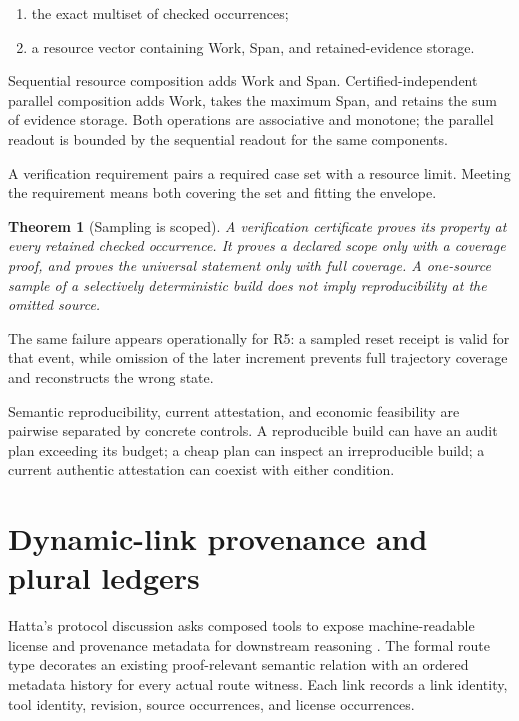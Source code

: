 \documentclass[11pt]{article}
\newtheorem{theorem}[definition]{Theorem}
\begin{document}
\begin{enumerate}
  \item the exact multiset of checked occurrences;
  \item a resource vector containing Work, Span, and retained-evidence storage.
\end{enumerate}

Sequential resource composition adds Work and Span.  Certified-independent
parallel composition adds Work, takes the maximum Span, and retains the sum of
evidence storage.  Both operations are associative and monotone; the parallel
readout is bounded by the sequential readout for the same components.

A verification requirement pairs a required case set with a resource limit.
Meeting the requirement means both covering the set and fitting the envelope.

\begin{theorem}[Sampling is scoped]
A verification certificate proves its property at every retained checked
occurrence.  It proves a declared scope only with a coverage proof, and proves
the universal statement only with full coverage.  A one-source sample of a
selectively deterministic build does not imply reproducibility at the omitted
source.
\end{theorem}

The same failure appears operationally for R5: a sampled reset receipt is
valid for that event, while omission of the later increment prevents full
trajectory coverage and reconstructs the wrong state.

Semantic reproducibility, current attestation, and economic feasibility are
pairwise separated by concrete controls.  A reproducible build can have an
audit plan exceeding its budget; a cheap plan can inspect an irreproducible
build; a current authentic attestation can coexist with either condition.

\section{Dynamic-link provenance and plural ledgers}

Hatta's protocol discussion asks composed tools to expose machine-readable
license and provenance metadata for downstream reasoning \cite{hatta2026}.
The formal route type decorates an existing proof-relevant semantic relation
with an ordered metadata history for every actual route witness.  Each link
records a link identity, tool identity, revision, source occurrences, and
license occurrences.
\end{document}
